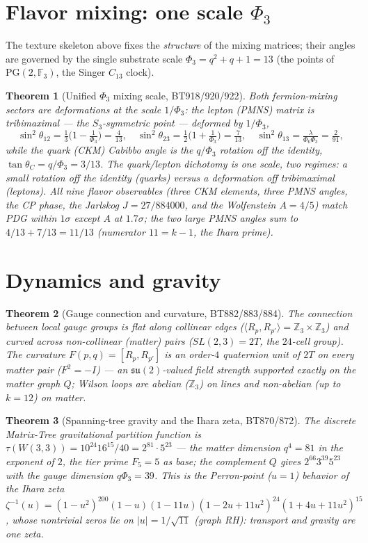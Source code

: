 \documentclass[11pt]{article}
\newtheorem{theorem}{Theorem}
\newcommand{\W}{W(3,3)}
\newcommand{\GF}[1]{\mathbb{F}_{#1}}
\newcommand{\Z}{\mathbb{Z}}
\begin{document}
\section{Flavor mixing: one scale $\Phi_3$}
The texture skeleton above fixes the \emph{structure} of the mixing
matrices; their angles are governed by the single substrate scale
$\Phi_3=q^2+q+1=13$ (the points of $\mathrm{PG}(2,\GF3)$, the Singer
$C_{13}$ clock).

\begin{theorem}[Unified $\Phi_3$ mixing scale, BT918/920/922]
Both fermion-mixing sectors are deformations at the scale $1/\Phi_3$:
the lepton (PMNS) matrix is tribimaximal --- the $S_3$-symmetric point
--- deformed by $1/\Phi_3$,
\[
\sin^2\theta_{12}=\tfrac13\bigl(1-\tfrac1{\Phi_3}\bigr)=\tfrac4{13},
\quad
\sin^2\theta_{23}=\tfrac12\bigl(1+\tfrac1{\Phi_3}\bigr)=\tfrac7{13},
\quad
\sin^2\theta_{13}=\tfrac{\lambda}{\Phi_6\Phi_3}=\tfrac2{91},
\]
while the quark (CKM) Cabibbo angle is the $q/\Phi_3$ rotation off the
identity, $\tan\theta_C=q/\Phi_3=3/13$. The quark/lepton dichotomy is
one scale, two regimes: a small rotation off the identity (quarks)
versus a deformation off tribimaximal (leptons). All nine flavor
observables (three CKM elements, three PMNS angles, the CP phase, the
Jarlskog $J=27/884000$, and the Wolfenstein $A=4/5$) match PDG within
$1\sigma$ except $A$ at $1.7\sigma$; the two large PMNS angles sum to
$4/13+7/13=11/13$ (numerator $11=k-1$, the Ihara prime).
\end{theorem}

\section{Dynamics and gravity}
\begin{theorem}[Gauge connection and curvature, BT882/883/884]
The connection between local gauge groups is flat along collinear edges
($\langle R_p,R_{p'}\rangle=\Z_3\times\Z_3$) and curved across
non-collinear (matter) pairs ($SL(2,3)=2T$, the $24$-cell group). The
curvature $F(p,q)=[R_p,R_{p'}]$ is an order-$4$ quaternion unit of $2T$
on every matter pair ($F^2=-I$) --- an $\mathfrak{su}(2)$-valued field
strength supported exactly on the matter graph $Q$; Wilson loops are
abelian ($\Z_3$) on lines and non-abelian (up to $k=12$) on matter.
\end{theorem}

\begin{theorem}[Spanning-tree gravity and the Ihara zeta, BT870/872]
The discrete Matrix-Tree gravitational partition function is
$\tau(\W)=10^{24}16^{15}/40=2^{81}\cdot5^{23}$ --- the matter dimension
$q^4=81$ in the exponent of $2$, the tier prime $F_5=5$ as base; the
complement $Q$ gives $2^{66}3^{39}5^{23}$ with the gauge dimension
$q\Phi_3=39$. This is the Perron-point ($u=1$) behavior of the Ihara
zeta $\zeta^{-1}(u)=(1-u^2)^{200}(1-u)(1-11u)(1-2u+11u^2)^{24}
(1+4u+11u^2)^{15}$, whose nontrivial zeros lie on $|u|=1/\sqrt{11}$
(graph RH): transport and gravity are one zeta.
\end{theorem}
\end{document}
